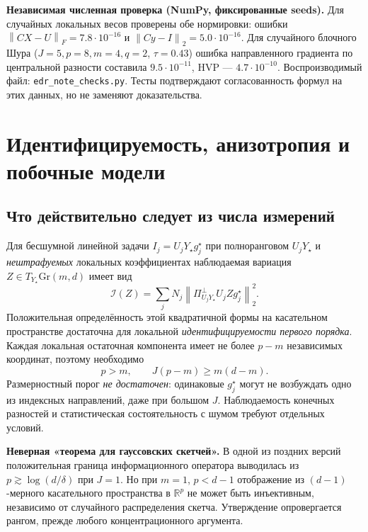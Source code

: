 \documentclass[10.5pt,a4paper]{article}
\newcommand{\R}{\mathbb{R}}
\newcommand{\Gr}{\mathrm{Gr}}
\newcommand{\norm}[1]{\left\|#1\right\|}
\numberwithin{equation}{section}
\theoremstyle{plain}
\theoremstyle{definition}
\begin{document}
\begin{proofbox}
\textbf{Независимая численная проверка (NumPy, фиксированные seeds).} Для случайных локальных весов проверены обе нормировки: ошибки $\norm{CX-U}_F=7.8\cdot10^{-16}$ и $\norm{Cy-I}_2=5.0\cdot10^{-16}$. Для случайного блочного Шура ($J=5,p=8,m=4,q=2$, $\tau=0.43$) ошибка направленного градиента по центральной разности составила $9.5\cdot10^{-11}$, HVP --- $4.7\cdot10^{-10}$. Воспроизводимый файл: \texttt{edr\_note\_checks.py}. Тесты подтверждают согласованность формул на этих данных, но не заменяют доказательства.
\end{proofbox}

\section{Идентифицируемость, анизотропия и побочные модели}
\subsection{Что действительно следует из числа измерений}
Для бесшумной линейной задачи $I_j=U_jY_\star g_j^\star$ при полноранговом $U_jY_\star$ и \emph{нештрафуемых} локальных коэффициентах наблюдаемая вариация $Z\in T_{Y_\star}\Gr(m,d)$ имеет вид
\begin{equation}
 \mathcal I(Z)=\sum_jN_j\norm{\Pi_{U_jY_\star}^\perp U_jZg_j^\star}_2^2.
 \label{eq:info}
\end{equation}
Положительная определённость этой квадратичной формы на касательном пространстве достаточна для локальной \emph{идентифицируемости первого порядка}. Каждая локальная остаточная компонента имеет не более $p-m$ независимых координат, поэтому необходимо
\begin{equation}
 p>m,\qquad J(p-m)\ge m(d-m).
 \label{eq:necessary}
\end{equation}
Размерностный порог \emph{не достаточен}: одинаковые $g_j^\star$ могут не возбуждать одно из индексных направлений, даже при большом $J$. Наблюдаемость конечных разностей и статистическая состоятельность с шумом требуют отдельных условий.

\begin{auditbox}
\textbf{Неверная «теорема для гауссовских скетчей».} В одной из поздних версий положительная граница информационного оператора выводилась из $p\gtrsim\log(d/\delta)$ при $J=1$. Но при $m=1$, $p<d-1$ отображение из $(d-1)$-мерного касательного пространства в $\R^p$ не может быть инъективным, независимо от случайного распределения скетча. Утверждение опровергается рангом, прежде любого концентрационного аргумента.
\end{auditbox}
\end{document}
